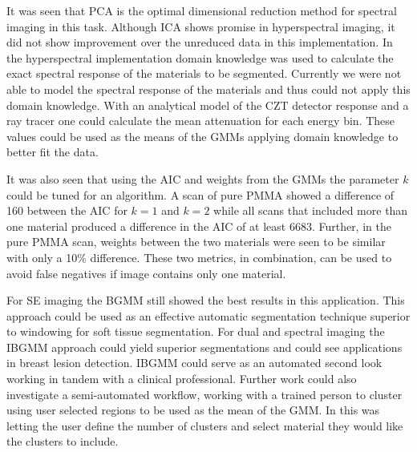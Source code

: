 \documentclass[a4paper,11pt]{article}
\begin{document}

It was seen that PCA is the optimal dimensional reduction method for spectral imaging in this task. Although ICA shows promise in hyperspectral imaging, it did not show improvement over the unreduced data in this implementation. In the hyperspectral implementation domain knowledge was used to calculate the exact spectral response of the materials to be segmented. Currently we were not able to model the spectral response of the materials and thus could not apply this domain knowledge. With an analytical model of the CZT detector response and a ray tracer one could calculate the mean attenuation for each energy bin. These values could be used as the means of the GMMs applying domain knowledge to better fit the data.

It was also seen that using the AIC and weights from the GMMs the parameter $k$ could be tuned for an algorithm. A scan of pure PMMA showed a difference of 160 between the AIC for $k=1$ and $k=2$ while all scans that included more than one material produced a difference in the AIC of at least 6683. Further, in the pure PMMA scan, weights between the two materials were seen to be similar with only a 10\% difference. These two metrics, in combination, can be used to avoid false negatives if image contains only one material.

For SE imaging the BGMM still showed the best results in this application. This approach could be used as an effective automatic segmentation technique superior to windowing for soft tissue segmentation. For dual and spectral imaging the IBGMM approach could yield superior segmentations and could see applications in breast lesion detection. IBGMM could serve as an automated second look working in tandem with a clinical professional. Further work could also investigate a semi-automated workflow, working with a trained person to cluster using user selected regions to be used as the mean of the GMM. In this was letting the user define the number of clusters and select material they would like the clusters to include.
\end{document}
